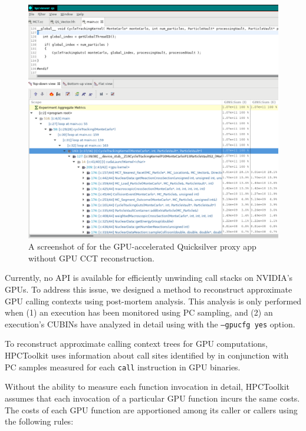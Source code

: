 \begin{figure}[t]
\centering
\includegraphics[width=\textwidth]{qs-no-cct.pdf}
\caption{A screenshot of \hpcviewer{} for the GPU-accelerated Quicksilver proxy app without GPU CCT reconstruction.}
\label{qs-no-cct}
\end{figure}


Currently, no API is available for efficiently unwinding call stacks on NVIDIA's GPUs.
To address this issue, we designed a method to reconstruct approximate GPU calling contexts using post-mortem analysis. This analysis is only performed when (1) an execution has been monitored using PC sampling, and (2) an execution's CUBINs have analyzed in detail using \hpcstruct{} with the {\tt --gpucfg yes} option.

To reconstruct approximate calling context trees for GPU computations, HPCToolkit uses information about call sites identified by \hpcstruct{} in conjunction with PC samples measured for each {\tt call} instruction in GPU binaries. 

Without the ability to measure each function invocation in detail, HPCToolkit assumes that each invocation of a particular GPU function incurs the same costs. The costs of each GPU function are apportioned among its caller or callers using the following rules:

